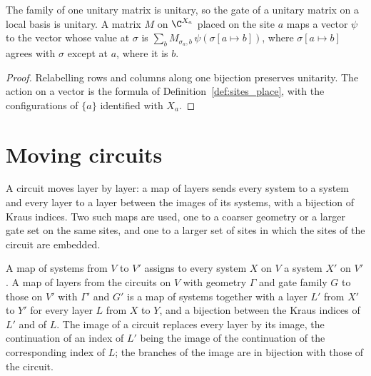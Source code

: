 \begin{lemma}
    \label{lem:circuits_local_gate_unitary}
    \leanok
    The family of one unitary matrix is unitary, so the gate of a unitary matrix on a
    local basis is unitary. A matrix $M$ on $\C^{X_a}$ placed on the site $a$ maps a
    vector $\psi$ to the vector whose value at $\sigma$ is
    $\sum_bM_{\sigma_a,b}\,\psi(\sigma[a\mapsto b])$, where $\sigma[a\mapsto b]$ agrees
    with $\sigma$ except at $a$, where it is $b$.
\end{lemma}
\begin{proof}\leanok
    Relabelling rows and columns along one bijection preserves unitarity. The action
    on a vector is the formula of Definition~\ref{def:sites_place}, with the
    configurations of $\{a\}$ identified with $X_a$.
\end{proof}

\section{Moving circuits}
\label{sec:circuits_maps}

A circuit moves layer by layer: a map of layers sends every system to a system and
every layer to a layer between the images of its systems, with a bijection of Kraus
indices. Two such maps are used, one to a coarser geometry or a larger gate set on
the same sites, and one to a larger set of sites in which the sites of the circuit
are embedded.

\begin{definition}
    \label{def:circuits_layer_map}
    \leanok
    A map of systems from $V$ to $V'$ assigns to every system $X$ on $V$ a system $X'$
    on $V'$. A map of layers from the circuits on $V$ with geometry $\Gamma$ and gate
    family $G$ to those on $V'$ with $\Gamma'$ and $G'$ is a map of systems together
    with a layer $L'$ from $X'$ to $Y'$ for every layer $L$ from $X$ to $Y$, and a
    bijection between the Kraus indices of $L'$ and of $L$. The image
    of a circuit replaces every layer by its image, the continuation of an index of
    $L'$ being the image of the continuation of the corresponding index of $L$; the
    branches of the image are in bijection with those of the circuit.
\end{definition}

